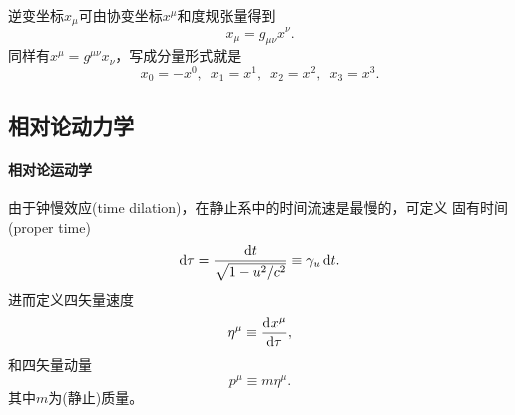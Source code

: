 逆变坐标$x_\mu$可由协变坐标$x^\mu$和度规张量得到
\begin{equation}
    x_\mu=g_{\mu\nu}x^\nu.
\end{equation}
同样有$x^\mu=g^{\mu\nu}x_\nu$，写成分量形式就是
\[
    x_0=-x^0,\enspace x_1=x^1,\enspace x_2=x^2,\enspace x_3=x^3.
\]

\subsection{相对论动力学}

\paragraph{相对论运动学}

由于钟慢效应(time dilation)，在静止系中的时间流速是最慢的，可定义
固有时间(proper time)
\[
    \mathop{}\!\mathrm{d}\tau=\frac{\mathop{}\!\mathrm{d} t}{\sqrt{1-u^2/c^2}}\equiv\gamma_u\mathop{}\!\mathrm{d} t.
\]
进而定义四矢量速度
\begin{equation}
    \eta^\mu\equiv\frac{\mathrm{d}^{{}}x^\mu}{\mathrm{d}{\tau}^{{}}},
\end{equation}
和四矢量动量
\begin{equation}
    p^\mu\equiv m\eta^\mu.
\end{equation}
其中$m$为(静止)质量。

